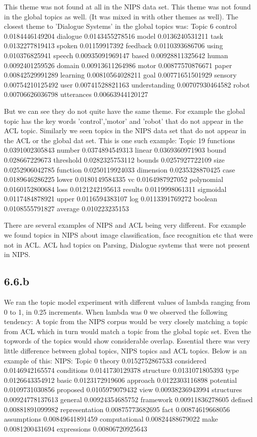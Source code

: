 \documentclass{article}
\begin{document}
This theme was not found at all in the NIPS data set. This theme was not found in the global topics as well.
(It was mixed in with other themes as well). The closest theme to 'Dialogue Systems' in the global topics was:
Topic 6
control 0.0184446149204
dialogue 0.0143455278516
model 0.0136240531211
task 0.0132277819413
spoken 0.01159917392
feedback 0.0110393686706
using 0.010376825941
speech 0.00935091969147
based 0.00928811325642
human 0.0092401259526
domain 0.00913611264986
motor 0.00877570876671
paper 0.00842529991289
learning 0.00810564028211
goal 0.00771651501929
sensory 0.00754210125492
user 0.00741528821163
understanding 0.00707930464582
robot 0.00706626036798
utterances 0.00663944120127

But we can see they do not quite have the same theme. For example the global topic has the key words 'control','motor'
and 'robot' that do not appear in the ACL topic.
Similarly we seen topics in the NIPS data set that do not appear in the ACL or the global dat set.
This is one such example:
Topic 19
functions 0.0391002305843
number 0.0374894549313
linear 0.0369360971903
bound 0.028667229673
threshold 0.0282325753112
bounds 0.0257927722109
size 0.0252906042785
function 0.0250119924033
dimension 0.0235328870425
case 0.0189646286225
lower 0.0180149584335
vc 0.0164987927052
polynomial 0.0160152800684
loss 0.0121242195613
results 0.0119998061311
sigmoidal 0.0117484878921
upper 0.0116594383107
log 0.0113391769272
boolean 0.0108555791827
average 0.010223235153

There are several examples of NIPS and ACL being very different. For example we found topics in NIPS about image classification,
face recognition etc that were not in ACL. ACL had topics on Parsing, Dialogue systems that were not present in NIPS.

\subsection*{6.6.b}
We ran the topic model experiment with different values of lambda ranging from 0 to 1, in 0.25 increments.
When lambda was 0 we observed the following tendency:
A topic from the NIPS corpus would be very closely matching a topic from ACL which in turn would match a topic from the global topic set.
Even the topwords of the topics would show considerable overlap. Essential there was very little difference between global topics, NIPS
topics and ACL topics. Below is an example of this:
NIPS:
Topic 0
theory 0.0152752867533
considered 0.0146942165574
conditions 0.0141730129378
structure 0.0131071805393
type 0.0126643354912
basic 0.0123172919606
approach 0.0122303116898
potential 0.0109731030856
proposed 0.0105979079432
view 0.00938236943994
structures 0.00924778137613
general 0.00924354685752
framework 0.00911836278605
defined 0.00881891099982
representation 0.00875773682695
fact 0.00874619668056
assumptions 0.00849641891459
computational 0.00824488679022
make 0.0081200431694
expressions 0.00806720925643
\end{document}
